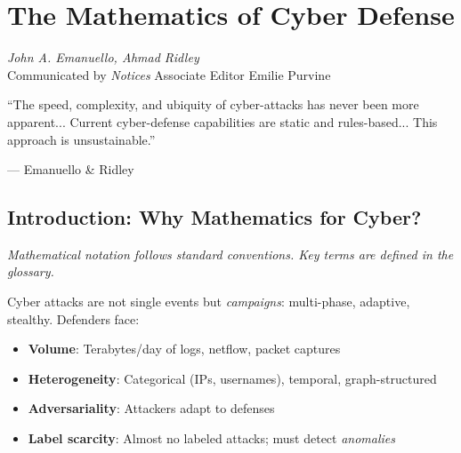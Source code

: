 \chapter{The Mathematics of Cyber Defense}
\label{ch:cyber} \cite{emanuello2022cyber}

\begin{flushright}
\textit{John A. Emanuello, Ahmad Ridley}\\
Communicated by \textit{Notices} Associate Editor Emilie Purvine
\end{flushright}

\epigraph{``The speed, complexity, and ubiquity of cyber-attacks has never been more apparent... Current cyber-defense capabilities are static and rules-based... This approach is unsustainable.''}{--- Emanuello \& Ridley} \cite{emanuello2022cyber}

\begin{abstract}
Cyber defense requires detecting anomalies in massive, heterogeneous data streams (logs, netflow, alerts) and responding autonomously. This chapter surveys the mathematical foundations: autoencoders for unsupervised anomaly detection, Word2Vec-style embeddings for categorical log data, and reinforcement learning for autonomous response. The unique challenges: adversarial dynamics, non-stationary distributions, and the need for human-machine teaming, \cite{emanuello2022cyber}.
\end{abstract}

\section{Introduction: Why Mathematics for Cyber?}

\noindent\textit{Mathematical notation follows standard conventions. Key terms are defined in the glossary.}\n
\label{sec:cyber:intro} \cite{emanuello2022cyber}

Cyber attacks are not single events but \emph{campaigns}: multi-phase, adaptive, stealthy. Defenders face:
\begin{itemize}
    \item \textbf{Volume}: Terabytes/day of logs, netflow, packet captures
    \item \textbf{Heterogeneity}: Categorical (IPs, usernames), temporal, graph-structured
    \item \textbf{Adversariality}: Attackers adapt to defenses
    \item \textbf{Label scarcity}: Almost no labeled attacks; must detect \emph{anomalies}
\end{itemize}


